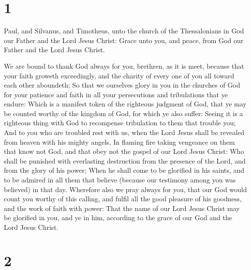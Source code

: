 \hypertarget{section}{%
\section{1}\label{section}}

 Paul, and Silvanus, and Timotheus, unto the church of the
Thessalonians in God our Father and the Lord Jesus Christ:
 Grace unto you, and peace, from God our Father and the
Lord Jesus Christ.

 We are bound to thank God always for you, brethren, as it
is meet, because that your faith groweth exceedingly, and the charity of
every one of you all toward each other aboundeth;  So that
we ourselves glory in you in the churches of God for your patience and
faith in all your persecutions and tribulations that ye endure:
 Which is a manifest token of the righteous judgment of
God, that ye may be counted worthy of the kingdom of God, for which ye
also suffer:  Seeing it is a righteous thing with God to
recompense tribulation to them that trouble you;  And to
you who are troubled rest with us, when the Lord Jesus shall be revealed
from heaven with his mighty angels,  In flaming fire
taking vengeance on them that know not God, and that obey not the gospel
of our Lord Jesus Christ:  Who shall be punished with
everlasting destruction from the presence of the Lord, and from the
glory of his power;  When he shall come to be glorified
in his saints, and to be admired in all them that believe (because our
testimony among you was believed) in that day.  Wherefore
also we pray always for you, that our God would count you worthy of this
calling, and fulfil all the good pleasure of his goodness, and the work
of faith with power:  That the name of our Lord Jesus
Christ may be glorified in you, and ye in him, according to the grace of
our God and the Lord Jesus Christ.

\hypertarget{section-1}{%
\section{2}\label{section-1}}

